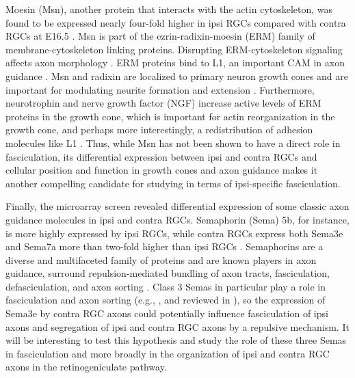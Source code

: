 Moesin (Msn), another protein that interacts with the actin cytoskeleton, was found to be expressed nearly four-fold higher in ipsi RGCs compared with contra RGCs at E16.5 \cite{wang2016ipsilateral}.
Msn is part of the ezrin-radixin-moesin (ERM) family of membrane-cytoskeleton linking proteins.
Disrupting ERM-cytoskeleton signaling affects axon morphology \cite{dickson2002functional,marsick2012activation}.
ERM proteins bind to L1, an important CAM in axon guidance \cite{dickson2002functional,marsick2012activation}. 
Msn and radixin are localized to primary neuron growth cones \invitro{} and are important for modulating neurite formation and extension \cite{paglini1998suppression}.
Furthermore, neurotrophin and nerve growth factor (NGF) increase active levels of ERM proteins in the growth cone, which is important for actin reorganization in the growth cone, and perhaps more interestingly, a redistribution of adhesion molecules like L1 \cite{marsick2012activation}.
Thus, while Msn has not been shown to have a direct role in fasciculation, its differential expression between ipsi and contra RGCs and cellular position and function in growth cones and axon guidance makes it another compelling candidate for studying in terms of ipsi-specific fasciculation.

Finally, the microarray screen revealed differential expression of some classic axon guidance molecules in ipsi and contra RGCs.
Semaphorin (Sema) 5b, for instance, is more highly expressed by ipsi RGCs, while contra RGCs express both Sema3e and Sema7a more than two-fold higher than ipsi RGCs \cite{wang2016ipsilateral}.
Semaphorins are a diverse and multifaceted family of proteins and are known players in axon guidance, surround repulsion-mediated bundling of axon tracts, fasciculation, defasciculation, and axon sorting \cite{raper2000semaphorins,tran2007semaphorin,imai2009pre,kolodkin2011mechanisms,kuwajima2012optic,zhou2013axon}.
Class 3 Semas in particular play a role in fasciculation and axon sorting (e.g., , and reviewed in ), so the expression of Sema3e by contra RGC axons could potentially influence fasciculation of ipsi axons and segregation of ipsi and contra RGC axons by a repulsive mechanism.
It will be interesting to test this hypothesis and study the role of these three Semas in fasciculation and more broadly in the organization of ipsi and contra RGC axons in the retinogeniculate pathway.

